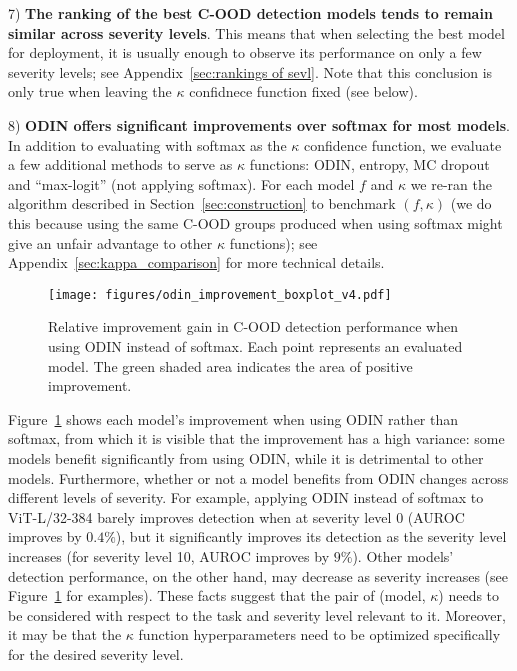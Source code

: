 \documentclass[table]{article} \usepackage{PRIMEarxiv}
\begin{document}
7) \textbf{The ranking of the best C-OOD detection models tends to remain similar across severity levels}. This means that when selecting the best model for deployment, it is usually enough to observe its performance on only a few severity levels; see Appendix~\ref{sec:rankings of sevl}. Note that this conclusion is only true when leaving the $\kappa$ confidnece function fixed (see below).

8) \textbf{ODIN offers significant improvements over softmax for most models}.
In addition to evaluating with softmax as the $\kappa$ confidence function, we evaluate a few additional methods to serve as $\kappa$ functions: ODIN, entropy, MC dropout and ``max-logit'' (not applying softmax).
For each model $f$ and $\kappa$ we re-ran the algorithm described in Section~\ref{sec:construction} to benchmark $(f, \kappa)$ (we do this because using the same C-OOD groups produced when using softmax might give an unfair advantage to other $\kappa$ functions); see Appendix~\ref{sec:kappa_comparison} for more technical details.


\begin{figure}[htb]
    \centering
\texttt{[image: figures/odin\_improvement\_boxplot\_v4.pdf]}
    \caption{Relative improvement gain in C-OOD detection performance when using ODIN instead of softmax. Each point represents an evaluated model.
    The green shaded area indicates the area of positive improvement.}
    \label{fig:odin_boxplots}
\end{figure}
Figure~\ref{fig:odin_boxplots} shows each model's improvement when using ODIN rather than softmax, 
from which it is visible that the improvement has a high variance: some models benefit significantly from using ODIN, while it is detrimental to other models. Furthermore, whether or not a model benefits from ODIN changes across different levels of severity. For example, applying ODIN instead of softmax to \textcolor{myteal}{ViT-L/32-384} barely improves detection when at severity level 0 (AUROC improves by $0.4\%$), but it significantly improves its detection as the severity level increases (for severity level 10, AUROC improves by $9\%$).
Other models' detection performance, on the other hand, may decrease as severity increases (see Figure~\ref{fig:odin_boxplots} for examples). 
These facts suggest that the pair of (model, $\kappa$) needs to be considered with respect to the task and severity level relevant to it. Moreover, it may be that the $\kappa$ function hyperparameters need to be optimized specifically for the desired severity level.
\end{document}
